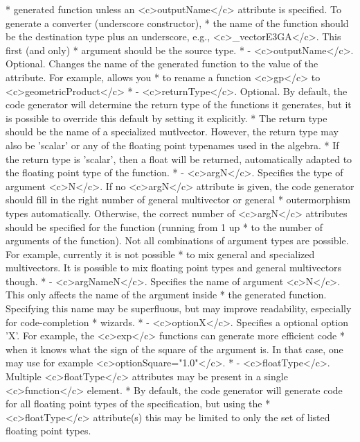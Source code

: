\documentclass[10pt, a4paper]{article}
\begin{document}
\begin{itemize}
 *           generated function unless an <c>outputName</c> attribute is specified. To generate a converter (underscore constructor),
 *           the name of the function should be the destination type plus an underscore, e.g., <c>_vectorE3GA</c>. This first (and only)
 *           argument should be the source type.
 *        - <c>outputName</c>. Optional. Changes the name of the generated function to the value of the attribute. For example, allows you
 *          to rename a function <c>gp</c> to <c>geometricProduct</c>
 *        - <c>returnType</c>. Optional. By default, the code generator will determine the return type of the functions it generates, but it is possible to override this default by setting it explicitly. 
 *          The return type should be the name of a specialized mutlvector. However, the return type may also be 'scalar' or any of the floating point typenames used in the algebra.
 *          If the return type is 'scalar', then a float will be returned, automatically adapted to the floating point type of the function.
 *        - <c>argN</c>. Specifies the type of argument <c>N</c>. If no <c>argN</c> attribute is given, the code generator should fill in the right number of general multivector or general 
 *           outermorphism types automatically. Otherwise, the correct number of <c>argN</c> attributes should be specified for the function (running from 1 up
 *           to the number of arguments of the function). Not all combinations of argument types are possible. For example, currently it is not possible
 *           to mix general and specialized multivectors. It is possible to mix floating point types and general multivectors though.
 *        - <c>argNameN</c>. Specifies the name of argument <c>N</c>. This only affects the name of the argument inside
 *           the generated function. Specifying this name may be superfluous, but may improve readability, especially for code-completion
 *           wizards. 
 *        - <c>optionX</c>. Specifies a optional option 'X'. For example, the <c>exp</c> functions can generate more efficient code
 *           when it knows what the sign of the square of the argument is. In that case, one may use for example <c>optionSquare="1.0"</c>.
 *        - <c>floatType</c>. Multiple <c>floatType</c> attributes may be present in a single <c>function</c> element. 
 *          By default, the code generator will generate code for all floating point types of the specification, but using the 
 *          <c>floatType</c> attribute(s) this may be limited to only the set of listed floating point types.

\end{itemize}
\end{document}
